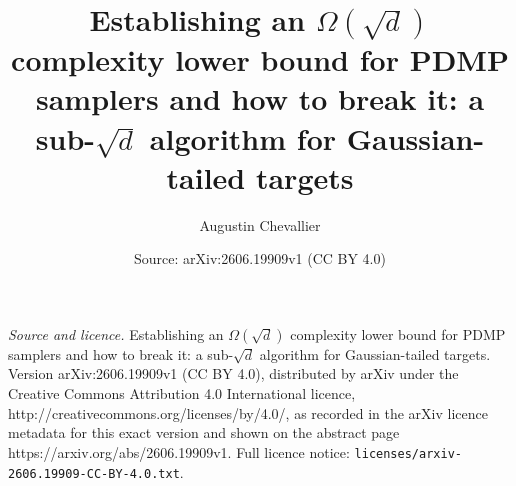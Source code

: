 \documentclass[10pt,a4paper]{amsart}
\title{Establishing an $\Omega(\sqrt{d})$ complexity lower bound for PDMP samplers and how to break it: a sub-$\sqrt{d}$ algorithm for Gaussian-tailed targets}
\author{Augustin Chevallier}
\date{Source: arXiv:2606.19909v1 (CC BY 4.0)}
\begin{document}
\maketitle

\noindent\emph{Source and licence.} Establishing an $\Omega(\sqrt{d})$ complexity lower bound for PDMP samplers and how to break it: a sub-$\sqrt{d}$ algorithm for Gaussian-tailed targets. Version arXiv:2606.19909v1 (CC BY 4.0), distributed by arXiv under the Creative Commons Attribution 4.0 International licence, http://creativecommons.org/licenses/by/4.0/, as recorded in the arXiv licence metadata for this exact version and shown on the abstract page https://arxiv.org/abs/2606.19909v1. Full licence notice: \texttt{licenses/arxiv-2606.19909-CC-BY-4.0.txt}.\par\smallskip
\end{document}
